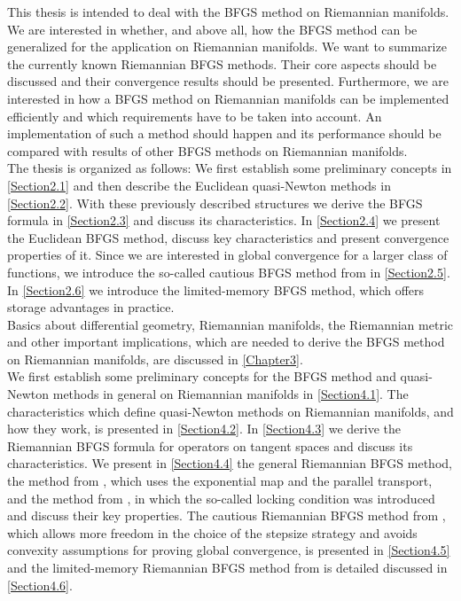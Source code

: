 This thesis is intended to deal with the BFGS method on Riemannian manifolds. We are interested in whether, and above all, how the BFGS method can be generalized for the application on Riemannian manifolds. We want to summarize the currently known Riemannian BFGS methods. Their core aspects should be discussed and their convergence results should be presented. Furthermore, we are interested in how a BFGS method on Riemannian manifolds can be implemented efficiently and which requirements have to be taken into account. An implementation of such a method should happen and its performance should be compared with results of other BFGS methods on Riemannian manifolds. \\
The thesis is organized as follows: We first establish some preliminary concepts in \cref{Section2.1} and then describe the Euclidean quasi-Newton methods in \cref{Section2.2}. With these previously described structures we derive the BFGS formula in \cref{Section2.3} and discuss its characteristics. In \cref{Section2.4} we present the Euclidean BFGS method, discuss key characteristics and present convergence properties of it. Since we are interested in global convergence for a larger class of functions, we introduce the so-called cautious BFGS method from \cite{LiFukushima:2001} in \cref{Section2.5}. In \cref{Section2.6} we introduce the limited-memory BFGS method, which offers storage advantages in practice. \\
Basics about differential geometry, Riemannian manifolds, the Riemannian metric and other important implications, which are needed to derive the BFGS method on Riemannian manifolds, are discussed in \cref{Chapter3}. \\
We first establish some preliminary concepts for the BFGS method and quasi-Newton methods in general on Riemannian manifolds in \cref{Section4.1}. The characteristics which define quasi-Newton methods on Riemannian manifolds, and how they work, is presented in \cref{Section4.2}. In \cref{Section4.3} we derive the Riemannian BFGS formula for operators on tangent spaces and discuss its characteristics. We present in \cref{Section4.4} the general Riemannian BFGS method, the method from \cite{Qi:2011}, which uses the exponential map and the parallel transport, and the method from \cite{HuangGallivanAbsil:2015}, in which the so-called locking condition was introduced and discuss their key properties. The cautious Riemannian BFGS method from \cite{HuangAbsilGallivan:2018}, which allows more freedom in the choice of the stepsize strategy and avoids convexity assumptions for proving global convergence, is presented in \cref{Section4.5} and the limited-memory Riemannian BFGS method from \cite{HuangGallivanAbsil:2015} is detailed discussed in \cref{Section4.6}. \\

